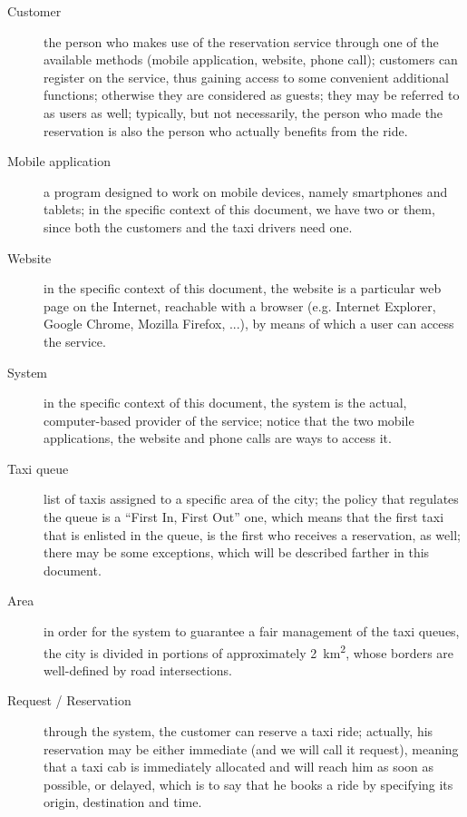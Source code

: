 \begin{description}
	\item [Customer] the person who makes use of the reservation service through one of the available methods (mobile application, website, phone call); customers can register on the service, thus gaining access to some convenient additional functions; otherwise they are considered as guests; they may be referred to as users as well; typically, but not necessarily, the person who made the reservation is also the person who actually benefits from the ride.
	\item [Mobile application] a program designed to work on mobile devices, namely smartphones and tablets; in the specific context of this document, we have two or them, since both the customers and the taxi drivers need one.
	\item [Website] in the specific context of this document, the website is a particular web page on the Internet, reachable with a browser (e.g. Internet Explorer, Google Chrome, Mozilla Firefox, ...), by means of which a user can access the service.
	\item [System] in the specific context of this document, the system is the actual, computer-based provider of the service; notice that the two mobile applications, the website and phone calls are ways to access it.  
	\item [Taxi queue] list of taxis assigned to a specific area of the city; the policy that regulates the queue is a ``First In, First Out'' one, which means that the first taxi that is enlisted in the queue, is the first who receives a reservation, as well; there may be some exceptions, which will be described farther in this document.
	\item [Area] in order for the system to guarantee a fair management of the taxi queues, the city is divided in portions of approximately \SI{2}{\square\kilo\meter}, whose borders are well-defined by road intersections.
	\item [Request / Reservation] through the system, the customer can reserve a taxi ride; actually, his reservation may be either immediate (and we will call it request), meaning that a taxi cab is immediately allocated and will reach him as soon as possible, or delayed, which is to say that he books a ride by specifying its origin, destination and time.
\end{description}


